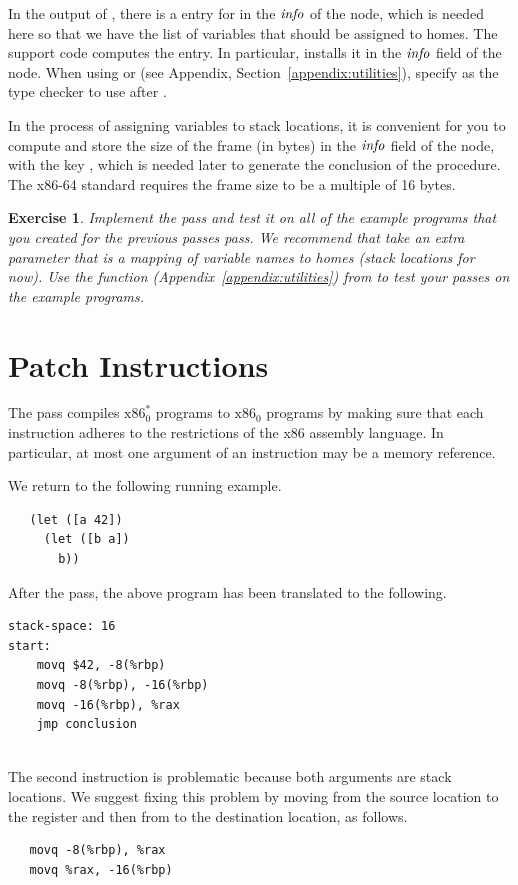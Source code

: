 \documentclass[11pt]{book}
\newtheorem{exercise}[theorem]{Exercise}
\begin{document}
In the output of , there is a entry for
 in the $\mathit{info}$ of the  node,
which is needed here so that we have the list of variables that should
be assigned to homes. The support code computes the
 entry. In particular, 
installs it in the $\mathit{info}$ field of the  node.
When using  or  (see Appendix,
Section~\ref{appendix:utilities}), specify  as the
type checker to use after .

In the process of assigning variables to stack locations, it is
convenient for you to compute and store the size of the frame (in
bytes) in the $\mathit{info}$ field of the  node, with the
key , which is needed later to generate the
conclusion of the  procedure. The x86-64 standard requires
the frame size to be a multiple of 16 bytes. 

\begin{exercise}
\normalfont Implement the  pass and test it on all
of the example programs that you created for the previous passes pass.
We recommend that  take an extra parameter that is a
mapping of variable names to homes (stack locations for now).  Use the
 function (Appendix~\ref{appendix:utilities}) from
 to test your passes on the example programs.
\end{exercise}


\section{Patch Instructions}
\label{sec:patch-s0}

The  pass compiles $\text{x86}^{*}_0$
programs to $\text{x86}_0$ programs by making sure that each
instruction adheres to the restrictions of the x86 assembly language.
In particular, at most one argument of an instruction may be a memory
reference.

We return to the following running example.
\begin{lstlisting}
   (let ([a 42])
     (let ([b a])
       b))
\end{lstlisting}
After the  pass, the above program has been translated to
the following. \\
\begin{minipage}{0.5\textwidth}
\begin{lstlisting}
stack-space: 16
start:
    movq $42, -8(%rbp)
    movq -8(%rbp), -16(%rbp)
    movq -16(%rbp), %rax
    jmp conclusion
\end{lstlisting}
\end{minipage}\\
The second  instruction is problematic because both
arguments are stack locations. We suggest fixing this problem by
moving from the source location to the register  and then
from  to the destination location, as follows.
\begin{lstlisting}
   movq -8(%rbp), %rax
   movq %rax, -16(%rbp)
\end{lstlisting}
\end{document}
